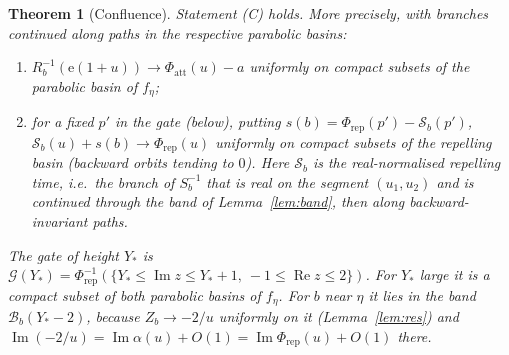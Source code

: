 \documentclass[11pt]{amsart}
\newtheorem{theorem}{Theorem}[section]
\theoremstyle{definition}
\newcommand{\Rr}{R}
\newcommand{\eee}{\mathrm{e}}
\begin{document}
\begin{theorem}[Confluence]\label{thm:C}
Statement \textup{(C)} holds.  More precisely, with branches continued along
paths in the respective parabolic basins:
\begin{enumerate}
\item $\Rr_b^{-1}(\eee(1+u))\to\Phi_{\mathrm{att}}(u)-a$ uniformly on compact
  subsets of the parabolic basin of $f_\eta$;
\item for a fixed $p'$ in the gate (below), putting
  $s(b)=\Phi_{\mathrm{rep}}(p')-\mathcal S_b(p')$,
  $\mathcal S_b(u)+s(b)\to\Phi_{\mathrm{rep}}(u)$ uniformly on compact
  subsets of the repelling basin (backward orbits tending to $0$).  Here
  $\mathcal S_b$ is the real-normalised repelling time, i.e.\ the branch of
  $S_b^{-1}$ that is real on the segment $(u_1,u_2)$ and is continued through
  the band of Lemma~\ref{lem:band}, then along backward-invariant paths.
\end{enumerate}
The \emph{gate} of height $Y_*$ is $\mathcal G(Y_*)=\Phi_{\mathrm{rep}}^{-1}
(\{Y_*\le\operatorname{Im}z\le Y_*+1,\ -1\le\operatorname{Re}z\le2\})$.  For $Y_*$ large it is a compact
subset of both parabolic basins of $f_\eta$.  For $b$ near $\eta$ it lies in
the band $\mathcal B_b(Y_*-2)$, because $Z_b\to-2/u$ uniformly on it
(Lemma~\ref{lem:res}) and $\operatorname{Im}(-2/u)=\operatorname{Im}\alpha(u)+O(1)
=\operatorname{Im}\Phi_{\mathrm{rep}}(u)+O(1)$ there.
\end{theorem}
\end{document}
